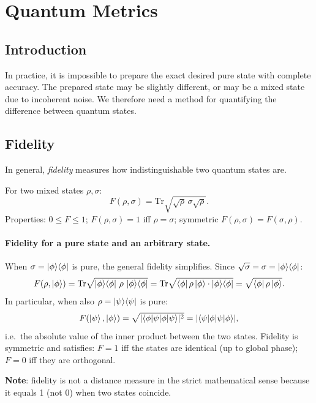 \documentclass[10pt,a4paper]{article}
\begin{document}
\section{Quantum Metrics}

\subsection{Introduction}

In practice, it is impossible to prepare the exact desired pure state with complete accuracy. The prepared state may be slightly different, or may be a mixed state due to incoherent noise. We therefore need a method for quantifying the difference between quantum states.

\subsection{Fidelity}
In general, \textit{fidelity} measures how indistinguishable two quantum states are.

\begin{tcolorbox}[defstyle, title={Definition}]
For two mixed states $\rho,\sigma$:
\[
F(\rho,\sigma)=\mathrm{Tr}\sqrt{\sqrt{\rho}\,\sigma\sqrt{\rho}}.
\]
Properties: $0\le F\le 1$; $F(\rho,\sigma)=1$ iff $\rho=\sigma$; symmetric $F(\rho,\sigma)=F(\sigma,\rho)$.
\end{tcolorbox}

\paragraph{Fidelity for a pure state and an arbitrary state.}
When $\sigma=\ket{\phi}\!\bra{\phi}$ is pure, the general fidelity simplifies. Since $\sqrt{\sigma}=\sigma=\ket{\phi}\!\bra{\phi}$:
\[
F(\rho,\ket{\phi})
=\mathrm{Tr}\sqrt{\ket{\phi}\!\bra{\phi}\,\rho\,\ket{\phi}\!\bra{\phi}}
=\mathrm{Tr}\sqrt{\bra{\phi}\rho\ket{\phi}\cdot\ket{\phi}\!\bra{\phi}}
=\sqrt{\bra{\phi}\rho\ket{\phi}}.
\]
In particular, when also $\rho=\ket{\psi}\!\bra{\psi}$ is pure:
\[
F(\ket{\psi},\ket{\phi})
=\sqrt{|\!\braket{\phi|\psi}\!|^{2}}
=|\!\braket{\psi|\phi}\!|,
\]
i.e.\ the absolute value of the inner product between the two states.
Fidelity is symmetric and satisfies: $F=1$ iff the states are identical (up to global phase); $F=0$ iff they are orthogonal.

\textbf{Note}: fidelity is not a distance measure in the strict mathematical sense because it equals 1 (not 0) when two states coincide.
\end{document}
